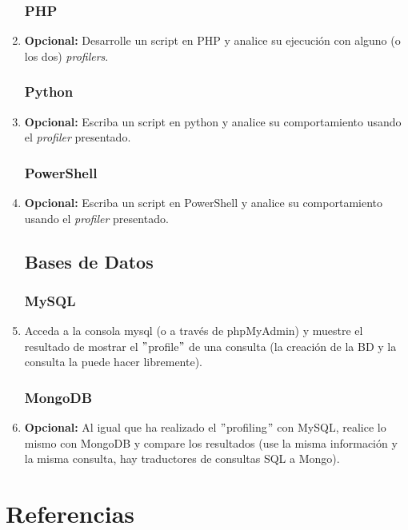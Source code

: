 \documentclass[paper=a4, fontsize=11pt]{scrartcl} %
\numberwithin{equation}{section} %
\numberwithin{figure}{section} %
\numberwithin{table}{section} %
\begin{document}
\begin{enumerate}
	\subsubsection{PHP}
		\item \textbf{Opcional:} Desarrolle un script en PHP y analice su ejecución con alguno (o
		los dos) \textit{profilers}.
		
	\subsubsection{Python}
		\item \textbf{Opcional:} Escriba un script en python y analice su comportamiento usando el
		\textit{profiler} presentado.
		
	\subsubsection{PowerShell}
		\item \textbf{Opcional:} Escriba un script en PowerShell y analice su comportamiento
		usando el \textit{profiler} presentado.
		
	\subsection{Bases de Datos}
	\subsubsection{MySQL}
		\item Acceda a la consola mysql (o a través de phpMyAdmin) y muestre el resultado de mostrar
		el $"$profile$"$ de una consulta (la creación de la BD y la consulta la puede hacer libremente).
		
	\subsubsection{MongoDB}
		\item \textbf{Opcional:} Al igual que ha realizado el $"$profiling$"$ con MySQL, realice lo
		mismo con MongoDB y compare los resultados (use la misma información y la misma consulta, hay
		traductores de consultas SQL a Mongo).
		
\end{enumerate}

\newpage
\section{Referencias}

\end{document}
